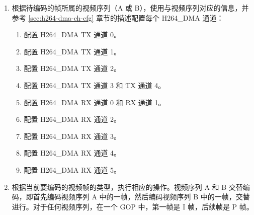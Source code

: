 \documentclass[main\_\_CN.tex]{subfiles}
\begin{document}
\begin{enumerate}
\begin{enumerate}
            \begin{itemize}
                \item \hyperref[fielddesc:H264SLICEBYTEMSB]{H264\_SLICE\_BYTE\_MSB}：切片头的第 41 位到第 10 位
                \item \hyperref[fielddesc:H264SLICEBYTELSB]{H264\_SLICE\_BYTE\_LSB}：切片头的第 9 位到第 2 位
                \item \hyperref[fielddesc:H264SLICEREMAINBIT]{H264\_SLICE\_REMAIN\_BIT}：切片头的第 1 位
                \item \hyperref[fielddesc:H264SLICEBYTELENGTH]{H264\_SLICE\_BYTE\_LENGTH}：5
                \item \hyperref[fielddesc:H264SLICEREMAINBITLENGTH]{H264\_SLICE\_REMAIN\_BITLENGTH}：1
            \end{itemize}
        \item 如需使用量化结果降采样功能，请参考 \ref{sec:h264-decimate} 章节配置相关寄存器。
        \item 如需使用配置宏块级码率控制功能，请参考 \ref{sec:h264-rate-ctrl} 章节配置相关寄存器。
        \item 如需使用 ROI 功能，请参考 \ref{sec:h264-roi} 章节配置相关寄存器。
        \item 如需使用 MV 合并功能，请参考 \ref{sec:h264-mv-merge} 章节配置相关寄存器。
    \end{enumerate}
    \item\label{item:h264-dual-dma} 根据待编码的帧所属的视频序列（A 或 B），使用与视频序列对应的信息，并参考 \ref{sec:h264-dma-ch-cfg} 章节的描述配置每个 H264\_DMA 通道：
    \begin{enumerate}
        \item 配置 H264\_DMA TX 通道 0。
        \item 配置 H264\_DMA TX 通道 1。
        \item 配置 H264\_DMA TX 通道 2。
        \item 配置 H264\_DMA TX 通道 3 和 TX 通道 4。
        \item 配置 H264\_DMA RX 通道 0 和 RX 通道 1。
        \item 配置 H264\_DMA RX 通道 2。
        \item 配置 H264\_DMA RX 通道 3。
        \item 配置 H264\_DMA RX 通道 4。
        \item 配置 H264\_DMA RX 通道 5。
    \end{enumerate}
    \item\label{item:h264-dual-frame} 根据当前要编码的视频帧的类型，执行相应的操作。视频序列 A 和 B 交替编码，即首先编码视频序列 A 中的一帧，然后编码视频序列 B 中的一帧，交替进行。对于任何视频序列，在一个 GOP 中，第一帧是 I 帧，后续帧是 P 帧。

\end{enumerate}
\end{document}
